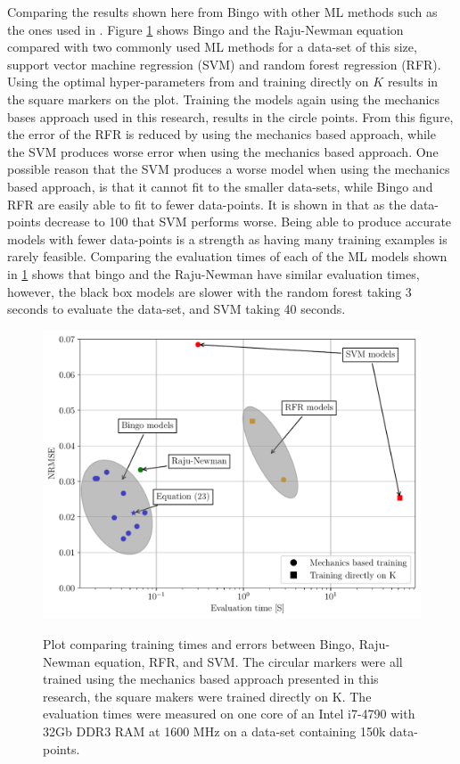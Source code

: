 Comparing the results shown here from Bingo with other ML methods such as the ones used in \cite{Tushar}. Figure \ref{fig:bingo_ml_comp} shows Bingo and the Raju-Newman equation compared with two commonly used ML methods for a data-set of this size, support vector machine regression (SVM) and random forest regression (RFR). Using the optimal hyper-parameters from \cite{Tushar} and training directly on $K$ results in the square markers on the plot. Training the models again using the mechanics bases approach used in this research, results in the circle points. From this figure, the error of the RFR is reduced by using the mechanics based approach, while the SVM produces worse error when using the mechanics based approach. One possible reason that the SVM produces a worse model when using the mechanics based approach, is that it cannot fit to the smaller data-sets, while Bingo and RFR are easily able to fit to fewer data-points. It is shown in \cite{tushar} that as the data-points decrease to 100 that SVM performs worse. Being able to produce accurate models with fewer data-points is a strength as having many training examples is rarely feasible. Comparing the evaluation times of each of the ML models shown in \ref{fig:bingo_ml_comp} shows that bingo and the Raju-Newman have similar evaluation times, however, the black box models are slower with the random forest taking 3 seconds to evaluate the data-set, and SVM taking 40 seconds. 
\begin{figure}
    \centering
    \includegraphics[width=\textwidth]{Figures_pdf/bingo_ml_comp.pdf}
    \label{fig:bingo_ml_comp}
    \caption{Plot comparing training times and errors between Bingo, Raju-Newman equation, RFR, and SVM. The circular markers were all trained using the mechanics based approach presented in this research, the square makers were trained directly on K. The evaluation times were measured on one core of an Intel i7-4790 with 32Gb DDR3 RAM at 1600 MHz on a data-set containing 150k data-points.}
\end{figure}
 

